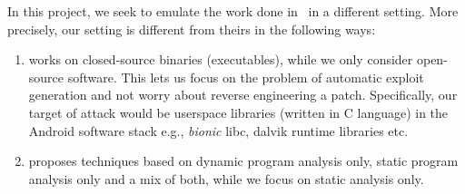 In this project, we seek to emulate the work done in~\cite{apeg08} in a different setting. More precisely, our setting is different from theirs in the following ways:
\begin{enumerate}
 \item \ap works on closed-source binaries (executables), while we only consider open-source software. This lets us focus on the problem of automatic exploit generation and not worry about reverse engineering a patch. Specifically, our target of attack would be userspace libraries (written in C language) in the Android software stack e.g., \textit{bionic} libc, dalvik runtime libraries etc.
 \item \ap proposes techniques based on dynamic program analysis only, static program analysis only and a mix of both, while we focus on static analysis only.
\end{enumerate}
% 
% 
